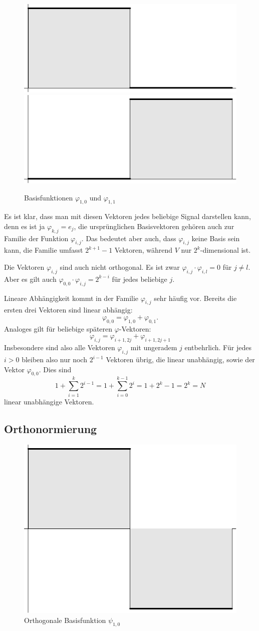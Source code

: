 \begin{figure}
\begin{center}
\includegraphics[width=0.45\hsize]{images/w-2}
\includegraphics[width=0.45\hsize]{images/w-3}
\end{center}
\caption{Basisfunktionen $\varphi_{1,0}$ und $\varphi_{1,1}$\label{wavelet-phi10-11}}
\end{figure}

Es ist klar, dass man mit diesen Vektoren jedes beliebige Signal
darstellen kann, denn es ist ja
$\varphi_{k,j}=e_j$, die ursprünglichen Basisvektoren gehören 
auch zur Familie der Funktion $\varphi_{i,j}$. Das bedeutet
aber auch, dass $\varphi_{i,j}$ keine Basis sein kann, die Familie
umfasst $2^{k+1}-1$ Vektoren, während $V$ nur $2^k$-dimensional ist.

Die Vektoren $\varphi_{i,j}$ sind auch nicht orthogonal. Es ist
zwar $\varphi_{i,j}\cdot\varphi_{i,l}=0$ für $j\ne l$. Aber es
gilt auch $\varphi_{0,0}\cdot\varphi_{i,j}=2^{k-i}$ für jedes
beliebige $j$.

Lineare Abhängigkeit kommt in der Familie $\varphi_{i,j}$ sehr
häufig vor. Bereits die ersten drei Vektoren sind linear
abhängig:
$$\varphi_{0,0}=\varphi_{1,0}+\varphi_{0,1}.$$
Analoges gilt für beliebige späteren $\varphi$-Vektoren:
$$
\varphi_{i,j}=\varphi_{i+1,2j}+\varphi_{i+1,2j+1}
$$
Insbesondere sind also alle Vektoren $\varphi_{i,j}$ mit 
ungeradem $j$ entbehrlich. Für jedes $i>0$ bleiben also
nur noch $2^{i-1}$ Vektoren übrig, die linear unabhängig,
sowie der Vektor $\varphi_{0,0}$. Dies sind
$$
1+\sum_{i=1}^k 2^{i-1}=1+\sum_{i=0}^{k-1}2^i=1+2^{k}-1=2^{k}=N
$$
linear unabhängige Vektoren.

\subsection{Orthonormierung}
\begin{figure}
\begin{center}
\includegraphics[width=0.45\hsize]{images/w-8}
\end{center}
\caption{Orthogonale Basisfunktion $\psi_{1,0}$\label{wavelet-psi10}}
\end{figure}

